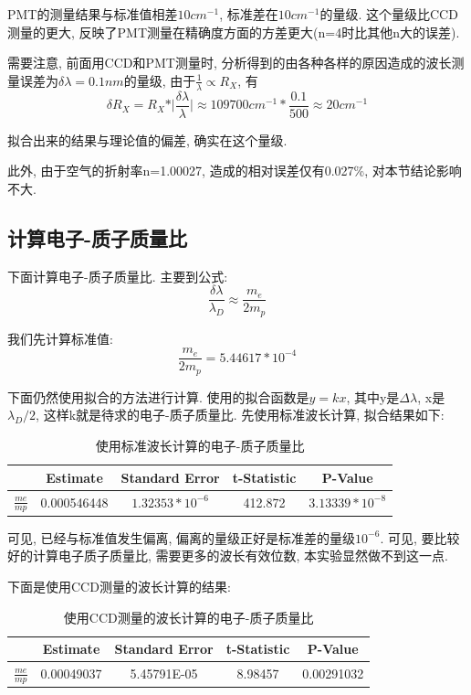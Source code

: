 \documentclass[12pt,a4paper]{article}
\begin{document}
PMT的测量结果与标准值相差$10cm^{-1}$, 标准差在$10cm^{-1}$的量级. 这个量级比CCD测量的更大, 反映了PMT测量在精确度方面的方差更大(n=4时比其他n大的误差). 

需要注意, 前面用CCD和PMT测量时, 分析得到的由各种各样的原因造成的波长测量误差为$\delta \lambda=0.1nm$的量级, 由于$\frac{1}{\lambda}\propto R_{X}$, 有
\begin{equation}
    \delta R_{X}=R_{X}*\vert\frac{\delta \lambda}{\lambda}\vert \approx 109700 cm^{-1} *\frac{0.1}{500}\approx 20 cm^{-1}
\end{equation}

拟合出来的结果与理论值的偏差, 确实在这个量级. 

此外, 由于空气的折射率n=1.00027, 造成的相对误差仅有0.027\%, 对本节结论影响不大. 
\subsection{计算电子-质子质量比}
下面计算电子-质子质量比. 主要到公式: 
\begin{equation}
    \frac{\delta \lambda}{\lambda_{D}} \approx \frac{m_{e}}{2 m_{p}}
\end{equation}

我们先计算标准值: 
\begin{equation}
    \frac{m_{e}}{2 m_{p}}=5.44617*10^{-4}
\end{equation}

下面仍然使用拟合的方法进行计算. 使用的拟合函数是$y=kx$, 其中y是$\Delta  \lambda$, x是$\lambda_{D}/2$, 这样k就是待求的电子-质子质量比. 
先使用标准波长计算, 拟合结果如下: 
\begin{table}[H]
    \centering
    \begin{tabular}{|c|c|c|c|c|}
    \hline
      & Estimate    & Standard Error                 & t-Statistic & P-Value                        \\ \hline
    $\frac{me}{mp}$ & 0.000546448 & $1.32353*10^{-6}$ & 412.872     & $3.13339*10^{-8}$ \\ \hline
    \end{tabular}
    \caption{使用标准波长计算的电子-质子质量比}
    \end{table}

可见, 已经与标准值发生偏离, 偏离的量级正好是标准差的量级$10^{-6}$. 可见, 要比较好的计算电子质子质量比, 需要更多的波长有效位数, 
本实验显然做不到这一点. 

下面是使用CCD测量的波长计算的结果: 
\begin{table}[H]
    \centering
    \begin{tabular}{|c|c|c|c|c|}
    \hline
      & Estimate   & Standard Error & t-Statistic & P-Value    \\ \hline
      $\frac{me}{mp}$ & 0.00049037 & 5.45791E-05    & 8.98457     & 0.00291032 \\ \hline
    \end{tabular}
    \caption{使用CCD测量的波长计算的电子-质子质量比}
    \end{table}
\end{document}

